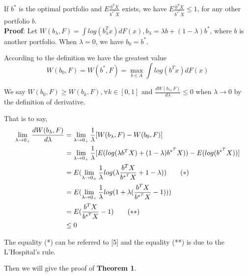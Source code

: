 \documentclass{gapd}
\begin{document}
\begin{lemma}
If $b^*$ is the optimal portfolio and $E\frac{b^T X}{b^{*^T}X}$ exists, we have $E\frac{b^T X}{b^{*^T}X} \le 1$, for any other portfolio $b$.\\
\textbf{Proof}: Let $W(b_{\lambda},F)=\int log(b_{\lambda}^T x)dF(x), b_{\lambda}=\lambda b+(1-\lambda)b^*$, where $b$ is another portfolio. When $\lambda=0$, we have $b_0=b^*$. 

According to the definition we have the greatest value
$$W(b_0,F)=W(b^*,F)=\mathop{\max}_{b \in A}\int log(b^T x)dF(x)$$

We say $W(b_0,F) \ge W(b_k,F),\forall k\in[0,1]$ and $\frac{dW(b_{\lambda},F)}{d\lambda}\le 0$ when $\lambda \to 0$ by the definition of derivative.

That is to say,
\begin{equation}
\begin{aligned}
\lim\limits_{\lambda \to 0_+ }\frac{dW(b_{\lambda},F)}{d\lambda}&=\lim\limits_{\lambda \to 0_+ }\frac{1}{\lambda}[W(b_{\lambda},F)-W(b_{0},F)]\\
&=\lim\limits_{\lambda \to 0_+ }\frac{1}{\lambda}[E(log(\lambda b^TX)+(1-\lambda)b^{*^T}X))-E(log(b^{*^T}X))]\\
&=E(\lim\limits_{\lambda \to 0_+ }\frac{1}{\lambda}log(\lambda \frac{b^T X}{b^{*^T}X}+1-\lambda)) \qquad(*)\\
&=E(\lim\limits_{\lambda \to 0_+ }\frac{1}{\lambda}log(1+\lambda (\frac{b^T X}{b^{*^T}X}-1)))\\
&=E(\frac{b^T X}{b^{*^T}X}-1) \qquad(**)\\
&\le 0
\end{aligned}\notag
\end{equation}

The equality (*) can be referred to [5] and the equality (**) is due to the L'Hospital's rule.

\end{lemma}

Then we will give the proof of \textbf{Theorem 1}.
\bigskip
\end{document}
